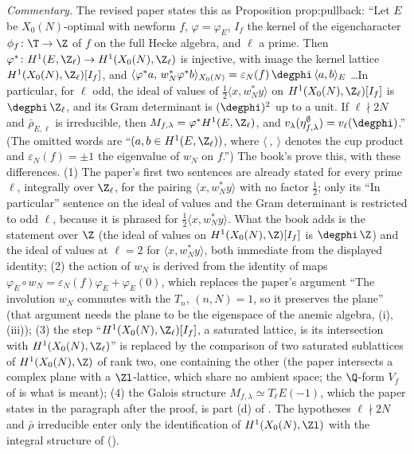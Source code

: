 \noindent\emph{Commentary.} The revised paper states this as Proposition prop:pullback: ``Let $E$ be $X_0(N)$-optimal with newform $f$, $\varphi=\varphi_E$, $I_f$ the kernel of the eigencharacter
$\phi_f\colon\T\to\Z$ of $f$ on the full Hecke algebra, and $\ell$ a prime. Then $\varphi^*\colon H^1(E,\Z_\ell)\to H^1(X_0(N),\Z_\ell)$ is injective, with image the kernel lattice
$H^1(X_0(N),\Z_\ell)[I_f]$, and $\langle\varphi^*a,\,w_N^*\varphi^*b\rangle_{X_0(N)}=\varepsilon_N(f)\,\degphi\,\langle a,b\rangle_E$ \dots In particular, for $\ell$ odd, the ideal of values of
$\frac12\langle x,w_N^*y\rangle$ on $H^1(X_0(N),\Z_\ell)[I_f]$ is $\degphi\,\Z_\ell$, and its Gram determinant is $(\degphi)^2$ up to a unit. If $\ell\nmid2N$ and $\bar\rho_{E,\ell}$ is irreducible, then
$M_{f,\lambda}=\varphi^*H^1(E,\Z_\ell)$, and $v_\lambda(\eta^\emptyset_{f,\lambda})=v_\ell(\degphi)$.'' (The omitted words are ``$(a,b\in H^1(E,\Z_\ell))$, where $\langle\ ,\ \rangle$ denotes the cup product and $\varepsilon_N(f)=\pm1$ the eigenvalue of $w_N$ on $f$.'') The book's
 prove this, with these differences. (1) The paper's first two sentences are already stated for every prime
$\ell$, integrally over $\Z_\ell$, for the pairing $\langle x,w_N^*y\rangle$ with no factor $\frac12$; only its ``In particular'' sentence on the ideal of values and the Gram determinant is
restricted to odd $\ell$, because it is phrased for $\frac12\langle x,w_N^*y\rangle$. What the book adds is the statement over $\Z$ (the ideal of values on $H^1(X_0(N),\Z)[I_f]$ is
$\degphi\,\Z$) and the ideal of values at $\ell=2$ for $\langle x,w_N^*y\rangle$, both immediate from the displayed identity; (2) the
action of $w_N$ is derived from the identity of maps $\varphi_E\circ w_N=\varepsilon_N(f)\varphi_E+\varphi_E(0)$, which replaces the paper's argument ``The involution $w_N$ commutes with the $T_n$,
$(n,N)=1$, so it preserves the plane'' (that argument needs the plane to be the eigenspace of the anemic algebra, (i), (iii)); (3) the step ``$H^1(X_0(N),\Z_\ell)[I_f]$,
a saturated lattice, is its intersection with $H^1(X_0(N),\Z_\ell)$'' is replaced by the comparison of two saturated sublattices of $H^1(X_0(N),\Z)$ of rank two, one containing the other
(the paper intersects a complex plane with a $\Zl$-lattice, which share no ambient space; the $\Q$-form $V_f$ of  is what is meant); (4) the Galois structure
$M_{f,\lambda}\simeq T_\ell E(-1)$, which the paper states in the paragraph after the proof, is part (d) of . The hypotheses $\ell\nmid2N$ and $\bar\rho$ irreducible
enter only the identification of $H^1(X_0(N),\Zl)$ with the integral structure of \cite{DFG04} ().

